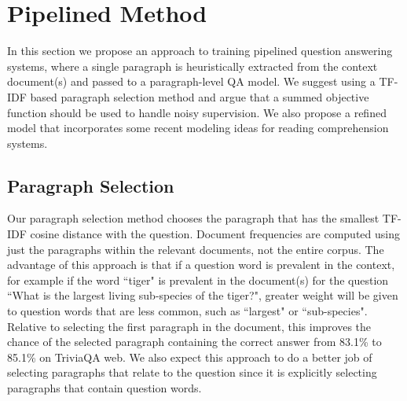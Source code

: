 \documentclass[11pt,a4paper]{article}
\begin{document}
\section{Pipelined Method}
\label{sect:paragraph-level-models}
In this section we propose an approach to training pipelined question answering systems, where a single paragraph is heuristically extracted from the context document(s) and passed to a paragraph-level QA model. We suggest using a TF-IDF based paragraph selection method and argue that a summed objective function should be used to handle noisy supervision. We also propose a refined model that incorporates some recent modeling ideas for reading comprehension systems. 

\subsection{Paragraph Selection}
Our paragraph selection method chooses the paragraph that has the smallest TF-IDF cosine distance with the question. Document frequencies are computed using just the paragraphs within the relevant documents, not the entire corpus. The advantage of this approach is that if a question word is prevalent in the context, for example if the word ``tiger" is prevalent in the document(s) for the question ``What is the largest living sub-species of the tiger?", greater weight will be given to question words that are less common, such as ``largest" or ``sub-species". Relative to selecting the first paragraph in the document, this improves the chance of the selected paragraph containing the correct answer from 83.1\% to 85.1\% on TriviaQA web. We also expect this approach to do a better job of selecting paragraphs that relate to the question since it is explicitly selecting paragraphs that contain question words. 

\end{document}
